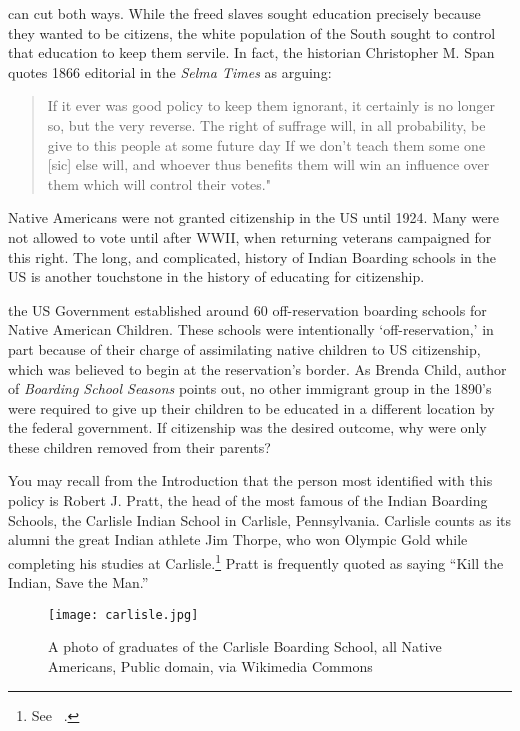  can cut both ways. While the freed slaves sought education precisely because they wanted to be citizens, the white population of the South sought to control that education to keep them servile. In fact, the historian Christopher M. Span quotes 1866 editorial in the \emph{Selma Times} as arguing:

\begin{quote}

If it ever was good policy to keep them ignorant, it certainly is no longer so, but the very reverse. The right of suffrage will, in all probability, be give to this people at some future day If we don't teach them some one [sic] else will, and whoever thus benefits them will win an influence over them which will control their votes." ~\citep[Quoted on p. 10]{Span:2012jc}
\end{quote}

Native Americans were not granted citizenship in the US until 1924. Many were not allowed to vote until after WWII, when returning veterans campaigned for this right. The long, and complicated, history of Indian Boarding schools in the US is another touchstone in the history of educating for citizenship. 

 the US Government established around 60 off-reservation boarding schools for Native American Children. These schools were intentionally `off-reservation,' in part because of their charge of assimilating native children to US citizenship, which was believed to begin at the reservation's border. As Brenda Child, author of \emph{Boarding School Seasons} points out, no other immigrant group in the 1890's were required to give up their children to be educated in a different location by the federal government. If citizenship was the desired outcome, why were only these children removed from their parents?

You may recall from the Introduction that the person most identified with this policy is Robert J. Pratt, the head of the most famous of the Indian Boarding Schools, the Carlisle Indian School in Carlisle, Pennsylvania. Carlisle counts as its alumni the great Indian athlete Jim Thorpe, who won Olympic Gold while completing his studies at Carlisle.\footnote{See ~\citep[p. 3--4]{Child:1998tk}.} Pratt is frequently quoted as saying ``Kill the Indian, Save the Man.'' \begin{figure*}\texttt{[image: carlisle.jpg]}\caption{A photo of graduates of the Carlisle Boarding School, all Native Americans, Public domain, via Wikimedia Commons}\label{fig:carlisle}\end{figure*}


